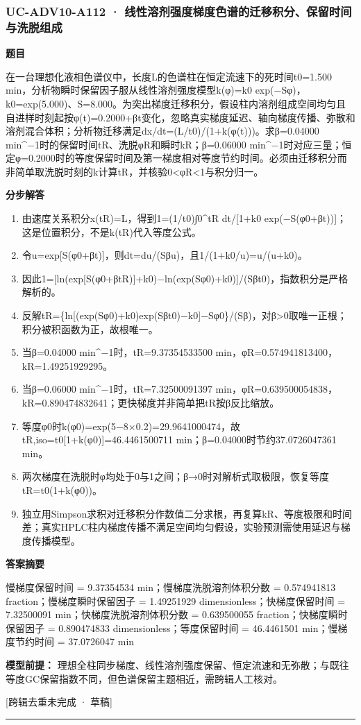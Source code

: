 \documentclass[UTF8,11pt,a4paper]{ctexart}
\begin{document}
\subsubsection*{UC-ADV10-A112 · 线性溶剂强度梯度色谱的迁移积分、保留时间与洗脱组成}
\noindent\textbf{题目}\par
在一台理想化液相色谱仪中，长度L的色谱柱在恒定流速下的死时间t0=1.500 min，分析物瞬时保留因子服从线性溶剂强度模型k(φ)=k0 exp(−Sφ)，k0=exp(5.000)、S=8.000。为突出梯度迁移积分，假设柱内溶剂组成空间均匀且自进样时刻起按φ(t)=0.2000+βt变化，忽略真实梯度延迟、轴向梯度传播、弥散和溶剂混合体积；分析物迁移满足dx/dt=(L/t0)/(1+k(φ(t)))。求β=0.04000 min\textasciicircum{}−1时的保留时间tR、洗脱φR和瞬时kR；β=0.06000 min\textasciicircum{}−1时对应三量；恒定φ=0.2000时的等度保留时间及第一梯度相对等度节约时间。必须由迁移积分而非简单取洗脱时刻的k计算tR，并核验0<φR<1与积分归一。\par
\medskip\noindent\textbf{分步解答}
\begin{enumerate}
\item 由速度关系积分x(tR)=L，得到1=(1/t0)∫0\textasciicircum{}tR dt/[1+k0 exp(−S(φ0+βt))]；这是位置积分，不是k(tR)代入等度公式。
\item 令u=exp[S(φ0+βt)]，则dt=du/(Sβu)，且1/(1+k0/u)=u/(u+k0)。
\item 因此1=[ln(exp[S(φ0+βtR)]+k0)−ln(exp(Sφ0)+k0)]/(Sβt0)，指数积分是严格解析的。
\item 反解tR=\{ln[(exp(Sφ0)+k0)exp(Sβt0)−k0]−Sφ0\}/(Sβ)，对β>0取唯一正根；积分被积函数为正，故根唯一。
\item 当β=0.04000 min\textasciicircum{}−1时，tR=9.37354533500 min，φR=0.574941813400，kR=1.49251929295。
\item 当β=0.06000 min\textasciicircum{}−1时，tR=7.32500091397 min，φR=0.639500054838，kR=0.890474832641；更快梯度并非简单把tR按β反比缩放。
\item 等度φ0时k(φ0)=exp(5−8×0.2)=29.9641000474，故tR,iso=t0[1+k(φ0)]=46.4461500711 min；β=0.04000时节约37.0726047361 min。
\item 两次梯度在洗脱时φ均处于0与1之间；β→0时对解析式取极限，恢复等度tR=t0(1+k(φ0))。
\item 独立用Simpson求积对迁移积分作数值二分求根，再复算kR、等度极限和时间差；真实HPLC柱内梯度传播不满足空间均匀假设，实验预测需使用延迟与梯度传播模型。
\end{enumerate}
\noindent\textbf{答案摘要}\par
慢梯度保留时间 = 9.37354534 min；慢梯度洗脱溶剂体积分数 = 0.574941813 fraction；慢梯度瞬时保留因子 = 1.49251929 dimensionless；快梯度保留时间 = 7.32500091 min；快梯度洗脱溶剂体积分数 = 0.639500055 fraction；快梯度瞬时保留因子 = 0.890474833 dimensionless；等度保留时间 = 46.4461501 min；慢梯度节约时间 = 37.0726047 min\par
\noindent\textbf{模型前提：}
理想全柱同步梯度、线性溶剂强度保留、恒定流速和无弥散；与既往等度GC保留指数不同，但色谱保留主题相近，需跨辑人工核对。\par
\noindent\textcolor{red!65!black}{[跨辑去重未完成 · 草稿]} \par
\medskip\hrule\medskip
{}
\end{document}
